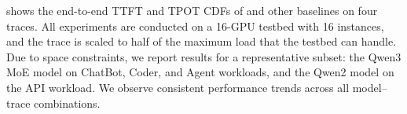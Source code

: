 

{} shows the end-to-end
TTFT and TPOT CDFs of {\sys} and other baselines on four traces.
All experiments are conducted on a 16-GPU testbed with 16 instances,
and the trace is scaled to half of the maximum load that the testbed can handle.
Due to space constraints, we report results for a representative subset: 
the Qwen3 MoE model on ChatBot, Coder, and Agent workloads, 
and the Qwen2 model on the API workload. 
We observe consistent performance trends across all model--trace combinations. 

